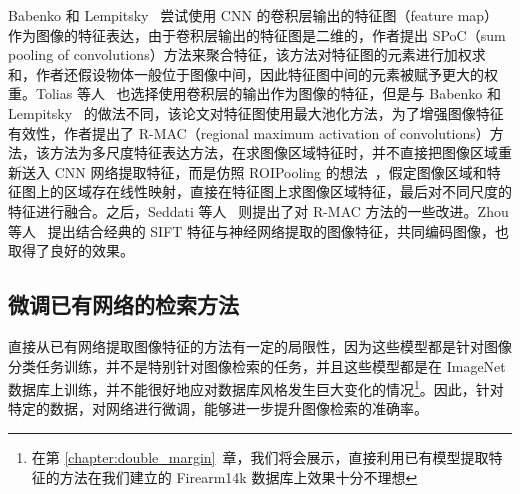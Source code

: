 Babenko 和 Lempitsky~\cite{Babenko2015AggregatingLD} 尝试使用 CNN 的卷积层输出的特征图（feature map）作为图像的特征表达，由于卷积层输出的特征图是二维的，作者提出 SPoC（sum pooling of convolutions）方法来聚合特征，该方法对特征图的元素进行加权求和，作者还假设物体一般位于图像中间，因此特征图中间的元素被赋予更大的权重。Tolias 等人~\cite{Tolias2015ParticularOR} 也选择使用卷积层的输出作为图像的特征，但是与 Babenko 和 Lempitsky~\cite{Babenko2015AggregatingLD} 的做法不同，该论文对特征图使用最大池化方法，为了增强图像特征有效性，作者提出了 R-MAC（regional maximum activation of convolutions）方法，该方法为多尺度特征表达方法，在求图像区域特征时，并不直接把图像区域重新送入 CNN 网络提取特征，而是仿照 ROIPooling 的想法~\cite{Ren2017FasterRT}，假定图像区域和特征图上的区域存在线性映射，直接在特征图上求图像区域特征，最后对不同尺度的特征进行融合。之后，Seddati 等人~\cite{Seddati2017TowardsGP} 则提出了对 R-MAC 方法的一些改进。Zhou 等人~\cite{Zhou2017CollaborativeIE} 提出结合经典的 SIFT 特征与神经网络提取的图像特征，共同编码图像，也取得了良好的效果。

\subsection{微调已有网络的检索方法}

直接从已有网络提取图像特征的方法有一定的局限性，因为这些模型都是针对图像分类任务训练，并不是特别针对图像检索的任务，并且这些模型都是在 ImageNet 数据库上训练，并不能很好地应对数据库风格发生巨大变化的情况\footnote{在第 \ref{chapter:double_margin}~章，我们将会展示，直接利用已有模型提取特征的方法在我们建立的 Firearm14k 数据库上效果十分不理想}。因此，针对特定的数据，对网络进行微调，能够进一步提升图像检索的准确率。

